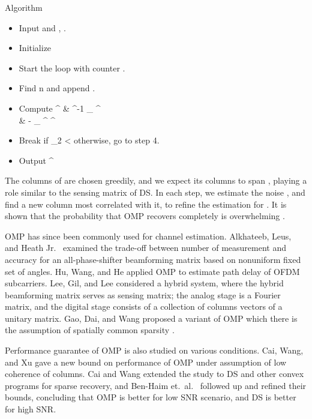\Result
{Algorithm}
{
\begin {itemize}
%
\item Input  and , .
%
\item Initialize
%
%
\item Start the loop with counter .
%
\item Find
%
 {
n
\leftarrow {} {}
}
%
and append .
%
\item Compute
%
 {
 ^\ddagger
\leftarrow & ^{-1}  _{} ^\dagger \\
%
\leftarrow & - _{} ^\dagger {} ^\ddagger {} 
}
%
\item Break if
%
 {
 _2
<\eta 
}
%
otherwise, go to step 4.
%
\item Output 
%
 {
\leftarrow {} ^\ddagger {} 
}
\end {itemize}
}
%
The columns of  are chosen greedily, and we expect its columns to span , playing a role similar to the sensing matrix of DS.
In each step, we estimate the noise , and find a new column most correlated with it, to refine the estimation for .
It is shown that the probability that OMP recovers  completely is overwhelming \cite {TrG07a}.

OMP has since been commonly used for channel estimation.
Alkhateeb, Leus, and Heath Jr.\ \cite {ALH15} examined the trade-off between number of measurement and accuracy for an all-phase-shifter beamforming matrix based on nonuniform fixed set of angles.
Hu, Wang, and He \cite {HWH13} applied OMP to estimate path delay of OFDM subcarriers.
Lee, Gil, and Lee \cite {LGL16} considered a hybrid system, where the hybrid beamforming matrix serves as sensing matrix;
the analog stage is a Fourier matrix, and the digital stage consists of a collection of columns vectors of a unitary matrix.
Gao, Dai, and Wang proposed a variant of OMP which there is the assumption of spatially common sparsity \cite {GDW15}.

Performance guarantee of OMP is also studied on various conditions.
Cai, Wang, and Xu \cite {CWX10} gave a new bound on performance of OMP under assumption of low coherence of columns.
Cai and Wang \cite {CaW11} extended the study to DS and other convex programs for sparse recovery, and Ben-Haim et.\ al.\ \cite {BEE10} followed up and refined their bounds, concluding that OMP is better for low SNR scenario, and DS is better for high SNR.

